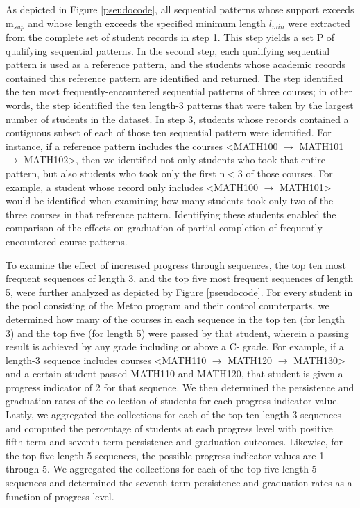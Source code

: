 As depicted in Figure \ref{pseudocode}, all sequential patterns whose support exceeds m$_{sup}$ and whose length exceeds the specified minimum length $l_{min}$ were extracted from the complete set of student records in step 1. This step yields a set P of qualifying sequential patterns.  In the second step, each qualifying sequential pattern is used as a reference pattern, and the students whose academic records contained this reference pattern are identified and returned.  The step identified the ten most frequently-encountered sequential patterns of three courses; in other words, the step identified the ten length-3 patterns that were taken by the largest number of students in the dataset.  In step 3, students whose records contained a contiguous subset of each of those ten sequential pattern were identified.  For instance, if a reference pattern includes the courses \textless MATH100 $\rightarrow$ MATH101 $\rightarrow$ MATH102\textgreater{}, then we identified not only students who took that entire pattern, but also students who took only the first n$<$3 of those courses.  For example, a student whose record only includes \textless MATH100 $\rightarrow$ MATH101\textgreater{} would be identified when examining how many students took only two of the three courses in that reference pattern.  Identifying these students enabled the comparison of the effects on graduation of partial completion of frequently-encountered course patterns.

To examine the effect of increased progress through sequences, the top ten most frequent sequences of length 3, and the top five most frequent sequences of length 5, were further analyzed as depicted by Figure \ref{pseudocode}.  For every student in the pool consisting of the Metro program and their control counterparts, we determined how many of the courses in each sequence in the top ten (for length 3) and the top five (for length 5) were passed by that student, wherein a passing result is achieved by any grade including or above a C- grade.  For example, if a length-3 sequence includes courses \textless MATH110 $\rightarrow$ MATH120 $\rightarrow$ MATH130\textgreater{} and a certain student passed MATH110 and MATH120, that student is given a progress indicator of 2 for that sequence.  We then determined the persistence and graduation rates of the collection of students for each progress indicator value.  Lastly, we aggregated the collections for each of the top ten length-3 sequences and computed the percentage of students at each progress level with positive fifth-term and seventh-term persistence and graduation outcomes.  Likewise, for the top five length-5 sequences, the possible progress indicator values are 1 through 5.  We aggregated the collections for each of the top five length-5 sequences and determined the seventh-term persistence and graduation rates as a function of progress level.

